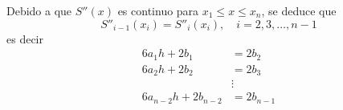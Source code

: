 \newpage

\begin{tcolorbox}[
        arc=0mm, 
        bottomtitle=0.5mm,
        boxrule=0mm,
        colbacktitle=black!10!white, 
        coltitle=black,
        left=2.5mm,
        leftrule=1mm,
        right=3.5mm,
        title={$S''(x)$ es continua en $[x_1, x_n]$.},
        toptitle=0.75mm,
        colframe=black!30!white,
    ]
    Debido a que $S''(x)$ es continuo para $x_1 \leq x \leq x_n$, se deduce que
    $$S''_{i-1}(x_i) = S''_i(x_i), \quad i = 2, 3, \dots, n-1$$
    es decir
    \begin{equation}
        \begin{aligned}
            6a_1h + 2b_1 & = 2b_2 \\
            6a_2h + 2b_2 & = 2b_3 \\
            & \vdots \\
            6a_{n-2}h + 2b_{n-2} & = 2b_{n-1}
        \end{aligned} \label{YAYACCXFTQTRQRTQZFGTA}
    \end{equation}
\end{tcolorbox}

